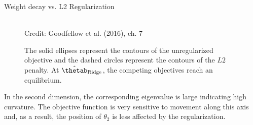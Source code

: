 \begin{vbframe}{Weight decay vs. L2 Regularization}
    \begin{figure}
    \centering
      \tiny{\\ Credit: Goodfellow et al. (2016), ch. 7}
      \caption{\footnotesize The solid ellipses represent the contours of the unregularized objective and the dashed circles represent the contours of the $L2$ penalty. At $\hat{\thetab}_{\text{Ridge}}$, the competing objectives reach an equilibrium.}
  \end{figure}
  
    In the second dimension, the corresponding eigenvalue is large indicating high curvature. The objective function is very sensitive to movement along this axis and, as a result, the position of $\theta_2$ is less affected by the regularization.
  
\end{vbframe}

\endlecture


